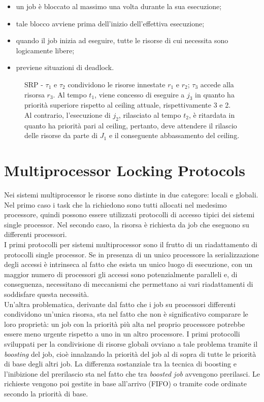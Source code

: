 \begin{itemize}
\item un job è bloccato al massimo una volta durante la sua esecuzione;
\item tale blocco avviene prima dell’inizio dell’effettiva esecuzione;
\item quando il job inizia ad eseguire, tutte le risorse di cui necessita sono logicamente libere;
\item previene situazioni di deadlock.
\end{itemize}

\begin{figure}
\centering
\SRP
\caption{SRP - $\tau_1$ e $\tau_2$ condividono le risorse innestate $r_1$ e $r_2$; $\tau_3$ accede alla risorsa $r_3$. Al tempo $t_1$, viene concesso di eseguire a $j_3$  in quanto ha priorità superiore rispetto al ceiling attuale, rispettivamente 3 e 2. Al contrario, l'esecuzione di $j_2$, rilasciato al tempo $t_2$, è ritardata in quanto ha priorità pari al ceiling, pertanto, deve attendere il rilascio delle risorse da parte di $J_1$ e il conseguente abbassamento del ceiling.}
\label{fig:SRP}
\end{figure}

\section{Multiprocessor Locking Protocols}
\label{sec:lockProtocols.multi}

Nei sistemi multiprocessor le risorse sono distinte in due categore: locali e globali. Nel primo caso i task che la richiedono sono tutti allocati nel medesimo processore, quindi possono essere utilizzati protocolli di accesso tipici dei sistemi single processor. Nel secondo caso, la risorsa è richiesta da job che eseguono su differenti processori.\\
I primi protocolli per sistemi multiprocessor sono il frutto di un riadattamento di protocolli single processor. Se in presenza di un unico processore la serializzazione degli accessi è intrinseca al fatto che esista un unico luogo di esecuzione, con un maggior numero di processori gli accessi sono potenzialmente paralleli e, di conseguenza, necessitano di meccanismi che permettano ai vari riadattamenti di soddisfare questa necessità.\\

Un'altra problematica, derivante dal fatto che i job su processori differenti condividono un'unica risorsa, sta nel fatto che non è significativo comparare le loro proprietà: un job con la priorità più alta nel proprio processore potrebbe essere meno urgente rispetto a uno in un altro processore. I primi protocolli sviluppati per la condivisione di risorse globali ovviano a tale problema tramite il \textit{boosting} del job, cioè innalzando la priorità del job al di sopra di tutte le priorità di base degli altri job. La differenza sostanziale tra la tecnica di boosting e l'inibizione del prerilascio sta nel fatto che tra \textit{boosted job} avvengono prerilasci. Le richieste vengono poi gestite in base all'arrivo (FIFO) o tramite code ordinate secondo la priorità di base.

